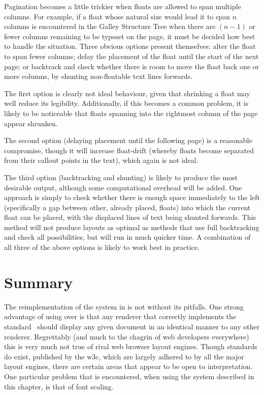 Pagination becomes a little trickier when floats are allowed to span multiple columns. For example, if a float whose natural size would lead it to span $n$ columns is encountered in the Galley Structure Tree when there are $(n-1)$ or fewer columns remaining to be typeset on the page, it must be decided how best to handle the situation. Three obvious options present themselves: alter the float to span fewer columns; delay the placement of the float until the start of the next page; or backtrack and check whether there is room to move the float back one or more columns, by shunting non-floatable text lines forwards.

The first option is clearly not ideal behaviour, given that shrinking a float may well reduce its legibility. Additionally, if this becomes a common problem, it is likely to be noticeable that floats spanning into the rightmost column of the page appear shrunken.

The second option (delaying placement until the following page) is a reasonable compromise, though it will increase float-drift (whereby floats become separated from their callout points in the text), which again is not ideal.

The third option (backtracking and shunting) is likely to produce the most desirable output, although some computational overhead will be added. One approach is simply to check whether there is enough space immediately to the left (specifically a gap between other, already placed, floats) into which the current float can be placed, with the displaced lines of text being shunted forwards. This method will not produce layouts as optimal as methods that use full backtracking and check all possibilities, but will run in much quicker time. A combination of all three of the above options is likely to work best in practice.



\section{Summary}

The reimplementation of the system in \html{} is not without its pitfalls. One strong advantage of using \pdf{} over \html{} is that any \pdf{} renderer that correctly implements the standard~\cite{Adobe2001} should display any given document in an identical manner to any other renderer. Regrettably (and much to the chagrin of web developers everywhere) this is very much not true of rival web browser layout engines. Though standards do exist, published by the \gls{w3c}, which are largely adhered to by all the major layout engines, there are certain areas that appear to be open to interpretation. One particular problem that is encountered, when using the system described in this chapter, is that of font scaling. 

